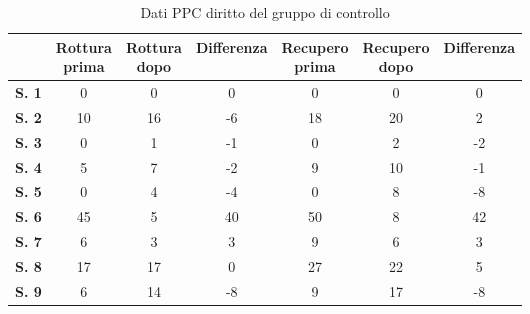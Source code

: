 \begin{table}[H]
\begin{center}
\begin{tabular}{|c|c|c|c|c|c|c|} \hline
{\textbf{}} & \pbox{20cm}{\textbf{Rottura} \\ \textbf{prima}} & \pbox{20cm}{\textbf{Rottura} \\ \textbf{dopo}} & \textbf{Differenza} & \pbox{20cm}{\textbf{Recupero} \\ \textbf{prima}} & \pbox{20cm}{\textbf{Recupero} \\ \textbf{dopo}} & \textbf{Differenza} \\ \hline
\textbf{S. 1} & 0 & 0 & 0 & 0 & 0 & 0 \\ \hline
\textbf{S. 2} & 10 & 16 & -6 & 18 & 20 & 2 \\ \hline
\textbf{S. 3} & 0 & 1 & -1 & 0 & 2 & -2 \\ \hline
\textbf{S. 4} & 5 & 7 & -2 & 9 & 10 & -1 \\ \hline
\textbf{S. 5} & 0 & 4 & -4 & 0 & 8 & -8 \\ \hline
\textbf{S. 6} & 45 & 5 & 40 & 50 & 8 & 42  \\ \hline
\textbf{S. 7} & 6 & 3 & 3 & 9 & 6 & 3 \\ \hline
\textbf{S. 8} & 17 & 17 & 0 & 27 & 22 & 5 \\ \hline
\textbf{S. 9} & 6 & 14 & -8 & 9 & 17 & -8 \\ \hline
\end{tabular}
\end{center}
\caption{Dati PPC diritto del gruppo di controllo}
\end{table}

\\\ \\\  


